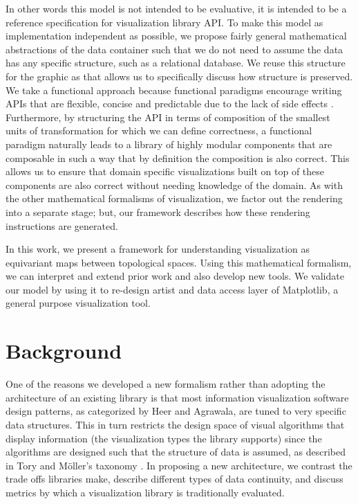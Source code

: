 \documentclass[../main.tex]{subfiles}
\begin{document}
In other words this model is not intended to be evaluative, it is intended to be a reference specification for visualization library API. To make this model as implementation independent as possible, we propose fairly general mathematical abstractions of the data container such that we do not need to assume the data has any specific structure, such as a relational database. We reuse this structure for the graphic as that allows us to specifically discuss how structure is preserved. We take a functional approach because functional paradigms encourage writing APIs that are flexible, concise and predictable due to the lack of side effects \cite{loudenProgrammingLanguagesPrinciples2010}. Furthermore, by structuring the API in terms of composition of the smallest units of transformation for which we can define correctness, a functional paradigm naturally leads to a library of highly modular components that are composable in such a way that by definition the composition is also correct. This allows us to ensure that domain specific visualizations built on top of these components are also correct without needing knowledge of the domain. As with the other mathematical formalisms of visualization, we factor out the rendering into a separate stage; but, our framework describes how these rendering instructions are generated. 

In this work, we present a framework for understanding visualization as equivariant maps between topological spaces. Using this mathematical formalism, we can interpret and extend prior work and also develop new tools. We validate our model by using it to re-design artist and data access layer of Matplotlib, a general purpose visualization tool.
 

\section{Background}
One of the reasons we developed a new formalism rather than adopting the architecture of an existing library is that most information visualization software design patterns, as categorized by Heer and Agrawala\cite{HeerSoftware2006}, are tuned to very specific data structures. This in turn restricts the design space of visual algorithms that display information (the visualization types the library supports) since the algorithms are designed such that the structure of data is assumed, as described in Tory and Möller's taxonomy \cite{ToryRethinkingVisualization2004}. In proposing a new architecture, we contrast the trade offs libraries make, describe different types of data continuity, and discuss metrics by which a visualization library is traditionally evaluated. 
\end{document}
